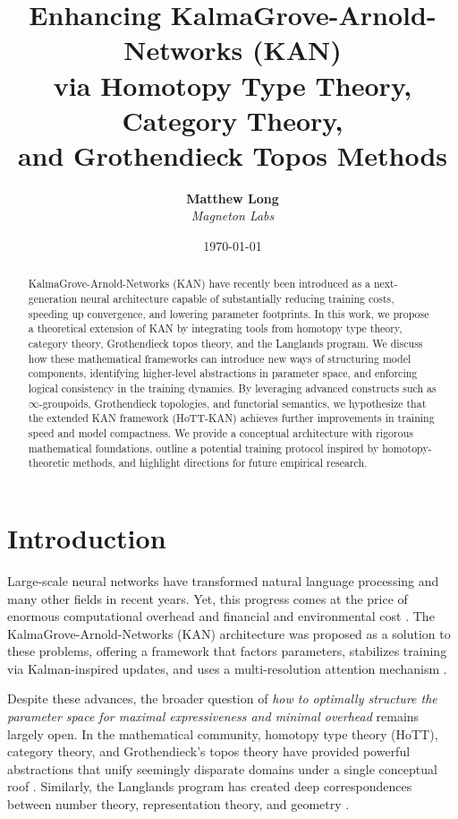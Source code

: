 \documentclass{article}
\title{%
Enhancing KalmaGrove-Arnold-Networks (KAN) \\
via Homotopy Type Theory, Category Theory, \\
and Grothendieck Topos Methods}
\author{
  \textbf{Matthew Long}\\
  \textit{Magneton Labs}
}
\date{\today}
\begin{document}
\maketitle

\begin{abstract}
KalmaGrove-Arnold-Networks (KAN) have recently been introduced as a next-generation neural architecture capable of substantially reducing training costs, speeding up convergence, and lowering parameter footprints. In this work, we propose a theoretical extension of KAN by integrating tools from homotopy type theory, category theory, Grothendieck topos theory, and the Langlands program. We discuss how these mathematical frameworks can introduce new ways of structuring model components, identifying higher-level abstractions in parameter space, and enforcing logical consistency in the training dynamics. By leveraging advanced constructs such as $\infty$-groupoids, Grothendieck topologies, and functorial semantics, we hypothesize that the extended KAN framework (HoTT-KAN) achieves further improvements in training speed and model compactness. We provide a conceptual architecture with rigorous mathematical foundations, outline a potential training protocol inspired by homotopy-theoretic methods, and highlight directions for future empirical research.
\end{abstract}

\section{Introduction}
\label{sec:intro}

Large-scale neural networks have transformed natural language processing and many other fields in recent years. Yet, this progress comes at the price of enormous computational overhead and financial and environmental cost \citep{strubell2019energy}. The KalmaGrove-Arnold-Networks (KAN) architecture was proposed as a solution to these problems, offering a framework that factors parameters, stabilizes training via Kalman-inspired updates, and uses a multi-resolution attention mechanism \citep{KAN2024}.

\vspace{1em}

Despite these advances, the broader question of \emph{how to optimally structure the parameter space for maximal expressiveness and minimal overhead} remains largely open. In the mathematical community, homotopy type theory (HoTT), category theory, and Grothendieck's topos theory have provided powerful abstractions that unify seemingly disparate domains under a single conceptual roof \citep{hottbook, maclane1971categories, grothendieck1972}. Similarly, the Langlands program has created deep correspondences between number theory, representation theory, and geometry \citep{langlands1970problems}.
\end{document}
